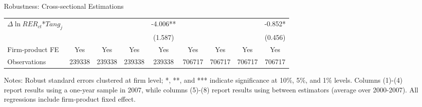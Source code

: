 \documentclass[10pt]{beamer}
\begin{document}
\begin{frame}{Robustness: Cross-sectional Estimations}
\begin{table}[htbp]
{\begin{threeparttable}
\begin{tabular}{lcccccccc}
			$\Delta \ln RER_{ct}$*$Tang_{j}$ &   &       &       & -4.006** &       &       &       & -0.852* \\
			&   &       &       & (1.587) &       &       &       & (0.456) \\
			Firm-product FE &  Yes   & Yes   & Yes   & Yes &Yes   & Yes   & Yes   & Yes\\
			Observations & 239338 & 239338 & 239338 & 239338 & 706717 & 706717 & 706717 & 706717 \\
			\bottomrule
		\end{tabular}
		\begin{tablenotes}
			\footnotesize
			\item Notes: Robust standard errors clustered at firm level; *, **, and *** indicate significance at 10\%, 5\%, and 1\% levels. Columns (1)-(4) report results using a one-year sample in 2007, while columns (5)-(8) report results using between estimators (average over 2000-2007). All regressions include firm-product fixed effect.
		\end{tablenotes}
	\end{threeparttable}
        }
	\label{tab.robust.crosec}
    \end{table}
    \hyperlink{robustness_other}{}
\end{frame}
\end{document}
